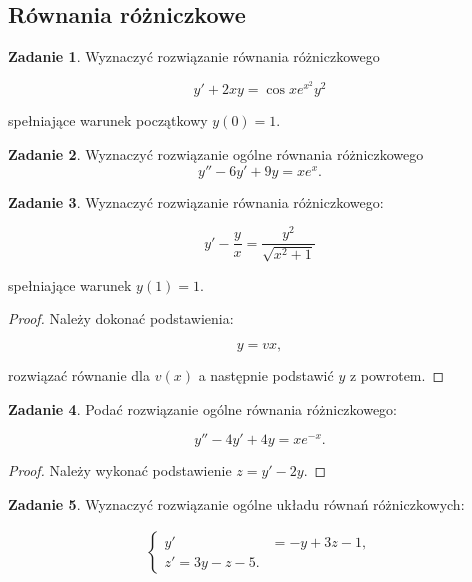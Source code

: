 \documentclass[11pt]{article}
\theoremstyle{definition}
\newtheorem{zadanie}{Zadanie}
\begin{document}
\subsection{Równania różniczkowe}

\begin{zadanie}
Wyznaczyć rozwiązanie równania różniczkowego

$$y' +2xy=\cos x e^{x^2}y^2$$

spełniające warunek początkowy $y(0)=1$.
\end{zadanie}

\begin{zadanie}
Wyznaczyć rozwiązanie ogólne równania różniczkowego
$$y''-6y'+9y = xe^x.$$
\end{zadanie}

\begin{zadanie}
Wyznaczyć rozwiązanie równania różniczkowego:

$$y' - \frac yx = \frac{y^2}{\sqrt{x^2+1}}$$

spełniające warunek $y(1)=1$.
\end{zadanie}
\begin{proof}
Należy dokonać podstawienia:

$$y = vx,$$

rozwiązać równanie dla $v(x)$ a następnie podstawić $y$ z powrotem.
\end{proof}

\begin{zadanie}
Podać rozwiązanie ogólne równania różniczkowego:

$$y'' - 4y' + 4y = xe^{-x}.$$
\end{zadanie}

\begin{proof}
Należy wykonać podstawienie $z = y' - 2y$.
\end{proof}

\begin{zadanie}
Wyznaczyć rozwiązanie ogólne układu równań różniczkowych:

\begin{align*}
    \begin{cases} y'&= -y+3z-1,\\
z'=3y-z-5.
    \end{cases}
\end{align*}
\end{zadanie}
\end{document}
